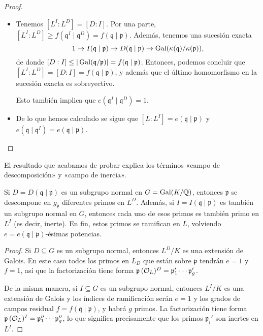 \begin{teorema}
\begin{proof}
\begin{itemize}
      \item Tenemos $[L^I : L^D] = [D : I]$. Por una parte,
        $[L^I : L^D] \ge f (\mathfrak{q}^I\mid\mathfrak{q}^D) = f (\mathfrak{q}\mid\mathfrak{p})$.
        Además, tenemos una sucesión exacta
        \[ 1 \to I (\mathfrak{q}\mid\mathfrak{p}) \to
        D (\mathfrak{q}\mid\mathfrak{p}) \to
        \operatorname{Gal} (\kappa(\mathfrak{q})/\kappa(\mathfrak{p})), \]
        de donde
        $[D : I] \le |\operatorname{Gal} (\mathfrak{q}/\mathfrak{p})| = f (\mathfrak{q}\mid\mathfrak{p})$.
        Entonces, podemos concluir que
        $[L^I : L^D] = [D : I] = f (\mathfrak{q}\mid\mathfrak{p})$, y además que
        el último homomorfismo en la sucesión exacta es sobreyectivo.

        Esto también implica que $e (\mathfrak{q}^I\mid\mathfrak{q}^D) = 1$.

      \item De lo que hemos calculado se sigue que
        $[L : L^I] = e (\mathfrak{q}\mid\mathfrak{p})$ y
        $e (\mathfrak{q}\mid\mathfrak{q}^I) = e (\mathfrak{q}\mid\mathfrak{p})$. \qedhere
    \end{itemize}
    \end{proof}
\end{teorema}

El resultado que acabamos de probar explica los términos
«campo de descomposición» y «campo de inercia».

\begin{corolario}
  Si $D = D (\mathfrak{q}\mid\mathfrak{p})$ es un subgrupo normal en
  $G = \operatorname{Gal} (K/\mathbb{Q})$, entonces $\mathfrak{p}$ se descompone en $g_\mathfrak{p}$
  diferentes primos en $L^D$. Además, si
  $I = I (\mathfrak{q}\mid\mathfrak{p})$ es también un subgrupo normal en $G$,
  entonces cada uno de esos primos es también primo en $L^I$ (es decir, inerte).
  En fin, estos primos se ramifican en $L$, volviendo
  $e = e (\mathfrak{q}\mid\mathfrak{p})$-ésimas potencias.

  \begin{proof}
    Si $D \subseteq G$ es un subgrupo normal, entonces $L^D/K$ es una extensión
    de Galois. En este caso todos los primos en $L_D$ que están sobre
    $\mathfrak{p}$ tendrán $e = 1$ y $f = 1$, así que la factorización tiene
    forma $\mathfrak{p}\,(\mathcal{O}_L)^D = \mathfrak{p}'_1\cdots\mathfrak{p}_g'$.

    De la misma manera, si $I \subseteq G$ es un subgrupo normal, entonces
    $L^I/K$ es una extensión de Galois y los índices de ramificación serán
    $e = 1$ y los grados de campos residual
    $f = f (\mathfrak{q}\mid\mathfrak{p})$, y habrá $g$ primos. La factorización
    tiene forma
    $\mathfrak{p}\,(\mathcal{O}_L)^I = \mathfrak{p}''_1\cdots\mathfrak{p}_g''$,
    lo que significa precisamente que los primos $\mathfrak{p}_i'$ son inertes
    en $L^I$.
  \end{proof}
\end{corolario}

